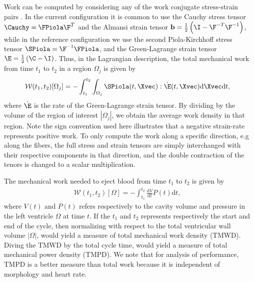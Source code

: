 Work can be computed by considering any of the
work conjugate stress-strain pairs \cite{holzapfel2000nonlinear}. In
the current configuration it is common to use the Cauchy stress tensor
$\Cauchy = \FPiola \F^T$ and the Almansi strain tensor $\mathbf{b} =
\frac{1}{2} \left(\I -  \F^{-T} \F^{-1} \right)$, while in
the reference configuration we use the second Piola-Kirchhoff stress
tensor $\SPiola = \F^{-1} \FPiola$, and the Green-Lagrange strain
tensor $\E = \frac{1}{2}\left(\C - \I \right)$. Thus, in the Lagrangian
description, the total mechanical work from time $t_1$ to $t_2$ in a
region $\Omega_j$ is given by
\begin{align}
   \mathcal{W}(t_1, t_2)[\Omega_j] = 
  -\int_{t_1}^{t_2} \int_{\Omega_j}\SPiola(t, \Xvec)
  : \dot{\E}(t, \Xvec) \mathrm{d}\Xvec \mathrm{d}t, 
\end{align}
where $ \dot{\E} $ is the rate of the Green-Lagrange strain tensor.
By dividing by the volume of the region of interest $| \Omega_j |$,
we obtain the average work density in that region. Note the sign
convention used here illustrates that a negative strain-rate
represents positive work. To only compute the
work along a specific direction, e.g along the fibers, the full stress
and strain tensors are simply interchanged with their respective
components in that direction, and the double contraction of the tenors
is changed to a scalar multiplication.

The mechanical work needed to eject blood from time $t_1$ to
$t_2$ is given by
\begin{align}
   \mathcal{W}(t_1, t_2)[\Omega] = 
  -\int_{t_1}^{t_2} \frac{\mathrm{d}V}{\mathrm{d}t} P(t) \mathrm{d}t,
\end{align}
where $V(t)$ and $P(t)$ refers respectively to the cavity volume and pressure in
the left ventricle $\Omega$ at time $t$. If the $t_1$ and $t_2$
represents respectively the start and end of the cycle, then normalizing with respect to the
total ventricular wall volume  $| \Omega |$, would yield a measure of
total mechanical work density (TMWD). Diving the TMWD by the total
cycle time, would yield a measure of total mechanical power
density (TMPD). We note that for analysis of performance, TMPD is
a better measure than total work because it is independent of
morphology and heart rate.  

